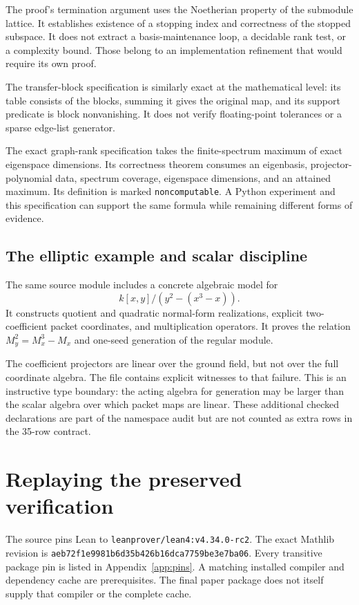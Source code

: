 \documentclass[11pt,a4paper]{article}
\newcommand{\code}[1]{\nolinkurl{#1}}
\begin{document}
The proof's termination argument uses the Noetherian property of the submodule lattice. It establishes existence of a stopping index and correctness of the stopped subspace. It does not extract a basis-maintenance loop, a decidable rank test, or a complexity bound. Those belong to an implementation refinement that would require its own proof.

The transfer-block specification is similarly exact at the mathematical level: its table consists of the blocks, summing it gives the original map, and its support predicate is block nonvanishing. It does not verify floating-point tolerances or a sparse edge-list generator.

The exact graph-rank specification takes the finite-spectrum maximum of exact eigenspace dimensions. Its correctness theorem consumes an eigenbasis, projector-polynomial data, spectrum coverage, eigenspace dimensions, and an attained maximum. Its definition is marked \code{noncomputable}. A Python experiment and this specification can support the same formula while remaining different forms of evidence.

\subsection{The elliptic example and scalar discipline}

The same source module includes a concrete algebraic model for
\[
k[x,y]/(y^2-(x^3-x)).
\]
It constructs quotient and quadratic normal-form realizations, explicit two-coefficient packet coordinates, and multiplication operators. It proves the relation $M_y^2=M_x^3-M_x$ and one-seed generation of the regular module.

The coefficient projectors are linear over the ground field, but not over the full coordinate algebra. The file contains explicit witnesses to that failure. This is an instructive type boundary: the acting algebra for generation may be larger than the scalar algebra over which packet maps are linear. These additional checked declarations are part of the namespace audit but are not counted as extra rows in the 35-row contract.

\section{Replaying the preserved verification}\label{sec:replay}

The source pins Lean to \code{leanprover/lean4:v4.34.0-rc2}. The exact Mathlib revision is \code{aeb72f1e9981b6d35b426b16dca7759be3e7ba06}. Every transitive package pin is listed in Appendix~\ref{app:pins}. A matching installed compiler and dependency cache are prerequisites. The final paper package does not itself supply that compiler or the complete cache.
\end{document}
